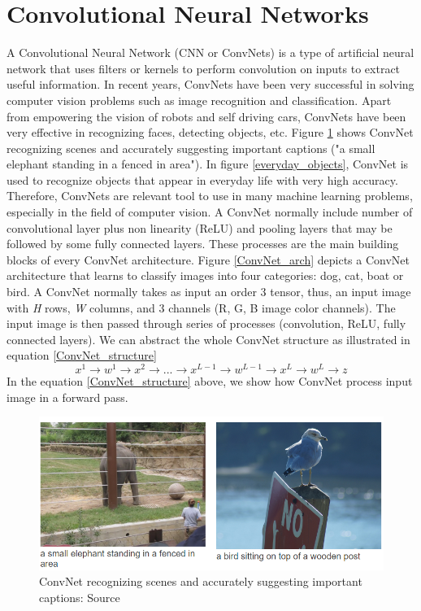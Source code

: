 \documentclass[master]{thesis-uestc}
\begin{document}
\section{Convolutional Neural Networks}
A Convolutional Neural Network (CNN or ConvNets) is a type of artificial neural network that uses filters or kernels to perform convolution on inputs to extract useful information. In recent years, ConvNets have been very successful in solving computer vision problems such as image recognition and classification. Apart from empowering the vision of robots and self driving cars, ConvNets have been very effective in recognizing faces, detecting objects, etc. Figure \ref{cnn_example} shows ConvNet recognizing scenes and accurately suggesting important captions ("a small elephant standing in a fenced in area"). In figure \ref{everyday_objects}, ConvNet is used to recognize objects that appear in everyday life with very high accuracy. Therefore, ConvNets are relevant tool to use in many machine learning problems, especially in the field of computer vision. A ConvNet normally include number of convolutional layer plus non linearity (ReLU) and pooling layers that may be followed by some fully connected layers. These processes are the main building blocks of every ConvNet architecture. Figure \ref{ConvNet_arch} depicts a ConvNet architecture that learns to classify images into four categories: dog, cat, boat or bird. A ConvNet normally takes as input an order 3 tensor, thus, an input image with \textit{H} rows, \textit{W} columns, and 3 channels (R, G, B image color channels). The input image is then passed through series of processes (convolution, ReLU, fully connected layers). We can abstract the whole ConvNet structure as illustrated in equation \ref{ConvNet_structure}
\begin{equation}
x^1 \rightarrow \boxed{ w^1 } \rightarrow  x^2 \rightarrow ... \rightarrow  x^{L-1} \rightarrow \boxed{ w^{L-1} } \rightarrow  x^L  \rightarrow \boxed{ w^L }  \rightarrow z
\label{ConvNet_structure}
\end{equation}
In the equation \ref{ConvNet_structure} above, we show how ConvNet process input image in a forward pass. 




\begin{figure}[ht]
\includegraphics[width=5in]{pic/CNN_example.PNG}
\caption{ConvNet recognizing scenes and accurately suggesting important captions: Source \cite{densecap}}
\label{cnn_example}
\end{figure}
\end{document}
